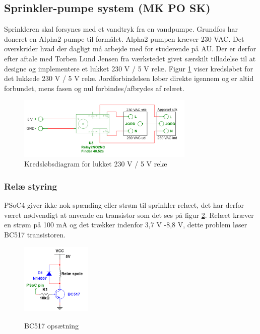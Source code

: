 
\subsection{Sprinkler-pumpe system (MK PO SK)}

Sprinkleren skal forsynes med et vandtryk fra en vandpumpe. Grundfos har doneret en Alpha2 pumpe til formålet. Alpha2 pumpen kræver 230 VAC. Det overskrider hvad der dagligt må arbejde med for studerende på AU. Der er derfor efter aftale med Torben Lund Jensen fra værkstedet givet særskilt tilladelse til at designe og implementere et lukket 230 V / 5 V relæ. Figur \ref{lab:Relay_box} viser kredsløbet for det lukkede 230 V / 5 V relæ. Jordforbindelsen løber direkte igennem og er altid forbundet, mens fasen og nul forbindes/afbrydes af relæet.  

\begin{figure}[H]
  \centering
    \includegraphics[width=0.75\textwidth]{Billeder/230VAC_KREDS}
    \caption{Kredsløbsdiagram for lukket 230 V / 5 V relæ}
    \label{lab:Relay_box}
\end{figure}

\subsubsection{Relæ styring}

PSoC4 giver ikke nok spænding eller strøm til sprinkler relæet, det har derfor været nødvendigt at anvende en transistor som det ses på figur \ref{lab:BC517}. Relæet kræver en strøm på 100 mA og det trækker indenfor 3,7 V -8,8 V, dette problem løser BC517 transistoren. 

\begin{figure}[H] \centering
{\includegraphics[width=0.3\textwidth]{Billeder/BC517}}
\caption{BC517 opsætning}
\label{lab:BC517}
\raggedright
\end{figure} 

